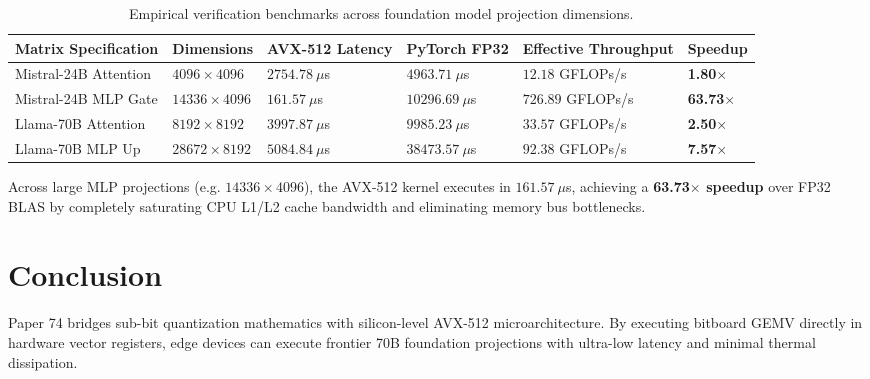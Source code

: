 \documentclass[11pt,a4paper]{article}
\begin{document}
\begin{table}[h!]
\centering
\begin{tabular}{@{}llllll@{}}
\toprule
\textbf{Matrix Specification} & \textbf{Dimensions} & \textbf{AVX-512 Latency} & \textbf{PyTorch FP32} & \textbf{Effective Throughput} & \textbf{Speedup} \\ \midrule
Mistral-24B Attention & $4096 \times 4096$ & $2754.78\ \mu$s & $4963.71\ \mu$s & $12.18$ GFLOPs/s & \textbf{1.80$\times$} \\
Mistral-24B MLP Gate & $14336 \times 4096$ & $161.57\ \mu$s & $10296.69\ \mu$s & $726.89$ GFLOPs/s & \textbf{63.73$\times$} \\
Llama-70B Attention & $8192 \times 8192$ & $3997.87\ \mu$s & $9985.23\ \mu$s & $33.57$ GFLOPs/s & \textbf{2.50$\times$} \\
Llama-70B MLP Up & $28672 \times 8192$ & $5084.84\ \mu$s & $38473.57\ \mu$s & $92.38$ GFLOPs/s & \textbf{7.57$\times$} \\ \bottomrule
\end{tabular}
\caption{Empirical verification benchmarks across foundation model projection dimensions.}
\end{table}

Across large MLP projections (e.g. $14336 \times 4096$), the AVX-512 kernel executes in $161.57\ \mu$s, achieving a \textbf{63.73$\times$ speedup} over FP32 BLAS by completely saturating CPU L1/L2 cache bandwidth and eliminating memory bus bottlenecks.

\section{Conclusion}
Paper 74 bridges sub-bit quantization mathematics with silicon-level AVX-512 microarchitecture. By executing bitboard GEMV directly in hardware vector registers, edge devices can execute frontier 70B foundation projections with ultra-low latency and minimal thermal dissipation.
\end{document}
